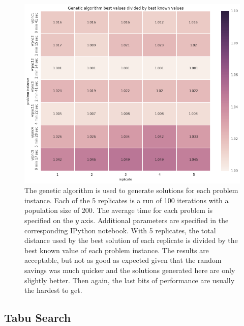 \documentclass{article} %
\begin{document}
\begin{figure}[!htb]
\begin{center}
 \includegraphics[scale=0.45]{figures/ga_best}
 \caption{\small  The genetic algorithm is used to generate solutions for each problem instance. Each of the 5 replicates is a run of 100 iterations with a population size of 200. The average time for each problem is specified on the $y$ axis. Additional parameters are specified in the corresponding IPython notebook. With 5 replicates, the total distance used by the best solution of each replicate is divided by the best known value of each problem instance. The results are acceptable, but not as good as expected given that the random savings was much quicker and the solutions generated here are only slightly better. Then again, the last bits of performance are usually the hardest to get.}
 \label{ga_fig}
 \end{center}
\end{figure}


\newpage
\subsection{Tabu Search}
\end{document}
